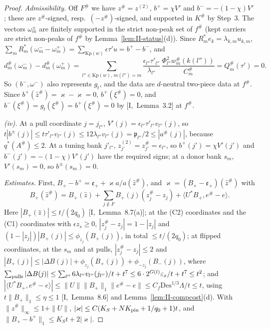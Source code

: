 \documentclass[10pt]{amsart}
\theoremstyle{definition}
\theoremstyle{remark}
\newcommand{\zh}{\hat z}
\newcommand{\ip}[2]{\langle #1,#2\rangle}
\begin{document}
\begin{proof}
\emph{Admissibility.}  Off $F^\#$ we have $z^\#=z^{(2)}$, $b^+=\chi V'$ and
$b^-=-(1-\chi)V'$; these are $z^\#$-signed, resp.\ $(-z^\#)$-signed, and
supported in $K^\#$ by Step~3.  The vectors $\omega^\pm_m$ are finitely
supported in the strict non-peak set of $f^\#$ (kept carriers are strict
non-peaks of $f^\#$ by Lemma~\ref{lem:II-status}(d)).  Since $R_m^*e_k=
\lambda_{k,m}u_{k,m}$, $\sum_mR_m^*(\omega^-_m-\omega^+_m)=\sum_{\mathrm{Kp}(w)}
\epsilon\tau'u=b^+-b^-$, and
\[
 d^\#_m(\omega^-_m)-d^\#_m(\omega^+_m)=\sum_{l''\in\mathrm{Kp}(w),\,m(l'')=m}
 \frac{\epsilon_{l''}\tau'_{l''}}{\lambda_{l''}}\,\frac{\Phi_{l''}^2
 w^\#_m(k(l''))}{C^\#_m}=Q^\#_m(\tau')=0 .
\]
So $(b^-,\omega^-)$ also represents $g_t$, and the data are $d$-neutral
two-piece data at $f^\#$.  Since $b^+(\zh^\#)=\varkappa-\varkappa=0$,
$b^+(\xi^\#)=0$, and $b^-(\xi^\#)=g_t(\xi^\#)=b^+(\xi^\#)=0$ by
[I,~Lemma~3.2] at $f^\#$.

\emph{(iv).}  At a pull coordinate $j=j_{l''}$, $V'(j)=\epsilon_{l''}
\tau'_{l''}v_{l''}(j)$, so $t|b^\pm(j)|\le t\tau'_{l''}v_{l''}(j)\le12
\lambda_{l''}v_{l''}(j)=\mathfrak p_{l''}/2\le|a^\#(j)|$, because $q^*(A^\#)
\le2$.  At a tuning bank $j'_{l''}$, $z^{(2)}_{j'}=z^\#_{j'}=\epsilon_{l''}$,
so $b^+(j')=\chi V'(j')$ and $b^-(j')=-(1-\chi)V'(j')$ have the required
signs; at a donor bank $s_m$, $V'(s_m)=0$, so $b^\pm(s_m)=0$.

\emph{Estimates.}  First, $B_+-b^+=\mathfrak e_++\varkappa a/a(\zh^\#)$, and
$\varkappa=(B_+-\mathfrak e_+)(\zh^\#)$ with
\[
 B_+(\zh^\#)=B_+(\zh)+\sum_{j\notin F}B_+(j)(z^\#_j-z_j)+\ip{U^*B_+}{e^\#-e}.
\]
Here $|B_+(\zh)|\le t/(2q_0)$ [I,~Lemma~8.7(a)]; at the (C2) coordinates and
the (C1) coordinates with $\epsilon z_s\ge0$, $|z^\#_j-z_j|=1-|z_j|$ and
$(1-|z_j|)|B_+(j)|\le\phi_{z_j}(B_+(j))$, in total $\le t/(2q_0)$; at
flipped coordinates, at the $s_m$ and at pulls, $|z^\#_j-z_j|\le2$ and
$|B_+(j)|\le|\Delta B(j)|+\phi_{z_j}(B_+(j))+\phi_{-z_j}(B_-(j))$, where
$\sum_{\rm pulls}|\Delta B(j)|\le\sum_{l''}6\lambda_{l''}v_{l''}(j_{l''})/t+t^7
\le6\cdot2^{G(l)}\varepsilon_x/t+t^7\le t^2$; and $|\ip{U^*B_+}{e^\#-e}|\le
\|U\|\|B_+\|_1\|e^\#-e\|\le C_f\mathrm{Des}^{1/3}\Lambda/t\le t$, using
$t\|B_+\|_1\le\eta\le1$ [I,~Lemma~8.6] and Lemma~\ref{lem:II-compcost}(d).
With $\|\zh^\#\|_\infty\le1+\|U\|$, $|\varkappa|\le C(K_S+NK_{\rm pin}+1/q_0
+1)t$, and $\|B_+-b^+\|_1\le K_St+2|\varkappa|$.


\end{proof}
\end{document}
